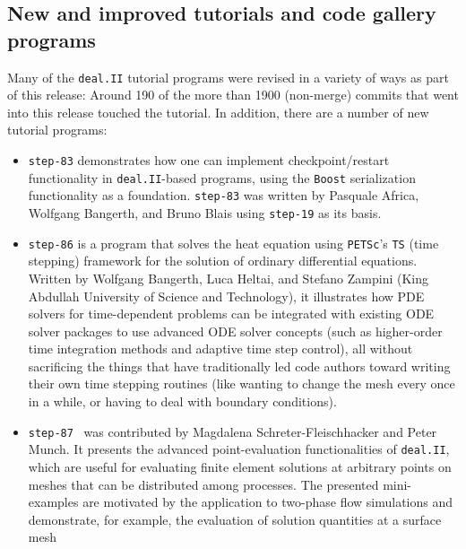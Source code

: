 \documentclass{ansarticle-preprint}
\newcommand{\specialword}[1]{\texttt{#1}}
\newcommand{\dealii}{{\specialword{deal.II}}\xspace}
\newcommand{\petsc}{\specialword{PETSc}\xspace}
\newcommand{\ts}{{\specialword{TS}}\xspace}
\newcommand{\boost}{{\specialword{Boost}}\xspace}
\newcommand{\step}[1]{{\specialword{step-#1}}\xspace}
\begin{document}
\subsection{New and improved tutorials and code gallery programs}
\label{subsec:steps}

Many of the \dealii tutorial programs were revised in a variety of ways
as part of this release: Around 190 of the more than 1900 (non-merge)
commits that went into this release touched the tutorial.
In addition, there are a number of new tutorial
programs:
\begin{itemize}
  \item
    \step{83}
    demonstrates how one can implement
    checkpoint/restart functionality in \dealii-based programs,
    using the \boost{} serialization functionality as a
    foundation. \step{83} was written by Pasquale Africa, Wolfgang
    Bangerth, and Bruno Blais using \step{19} as its basis.
  \item
    \step{86}
    is a program that solves the heat equation using \petsc's \ts{} (time
    stepping) framework for the solution of ordinary differential
    equations. Written by Wolfgang Bangerth, Luca Heltai, and Stefano Zampini
    (King Abdullah University of Science and Technology), it
    illustrates how PDE solvers for time-dependent problems can be
    integrated with existing ODE solver packages to use advanced ODE
    solver concepts (such as higher-order time integration methods and
    adaptive time step control), all without sacrificing the things
    that have traditionally led code authors toward writing their own
    time stepping routines (like wanting to change the mesh every
    once in a while, or having to deal with boundary conditions).
  \item
    \step{87}~\cite{schreter2023step87} was contributed by Magdalena Schreter-Fleischhacker
    and Peter Munch. It
    presents the advanced point-evaluation functionalities of \dealii,
    which are useful for evaluating finite element solutions at
    arbitrary points on meshes that can be distributed among
    processes. The presented mini-examples are motivated by the
    application to two-phase flow simulations and demonstrate, for
    example, the evaluation of solution quantities at a surface mesh

\end{itemize}
\end{document}
